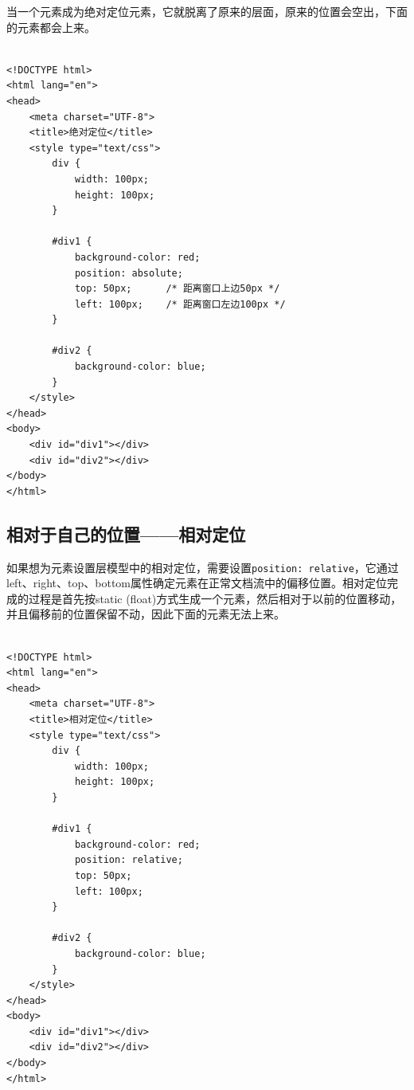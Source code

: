 当一个元素成为绝对定位元素，它就脱离了原来的层面，原来的位置会空出，下面的元素都会上来。 \\

 \\
\begin{lstlisting}[style=htmlcssjs]
<!DOCTYPE html>
<html lang="en">
<head>
    <meta charset="UTF-8">
    <title>绝对定位</title>
    <style type="text/css">
        div {
            width: 100px;
            height: 100px;
        }

        #div1 {
            background-color: red;
            position: absolute;
            top: 50px;      /* 距离窗口上边50px */
            left: 100px;    /* 距离窗口左边100px */
        }

        #div2 {
            background-color: blue;
        }
    </style>
</head>
<body>
    <div id="div1"></div>
    <div id="div2"></div>
</body>
</html>
\end{lstlisting}

\begin{figure}[H]
    \centering
\end{figure}

\subsection{相对于自己的位置——相对定位}

如果想为元素设置层模型中的相对定位，需要设置\lstinline|position: relative|，它通过left、right、top、bottom属性确定元素在正常文档流中的偏移位置。相对定位完成的过程是首先按static (float)方式生成一个元素，然后相对于以前的位置移动，并且偏移前的位置保留不动，因此下面的元素无法上来。 \\

 \\
\begin{lstlisting}[style=htmlcssjs]
<!DOCTYPE html>
<html lang="en">
<head>
    <meta charset="UTF-8">
    <title>相对定位</title>
    <style type="text/css">
        div {
            width: 100px;
            height: 100px;
        }

        #div1 {
            background-color: red;
            position: relative;
            top: 50px;
            left: 100px;
        }

        #div2 {
            background-color: blue;
        }
    </style>
</head>
<body>
    <div id="div1"></div>
    <div id="div2"></div>
</body>
</html>
\end{lstlisting}

